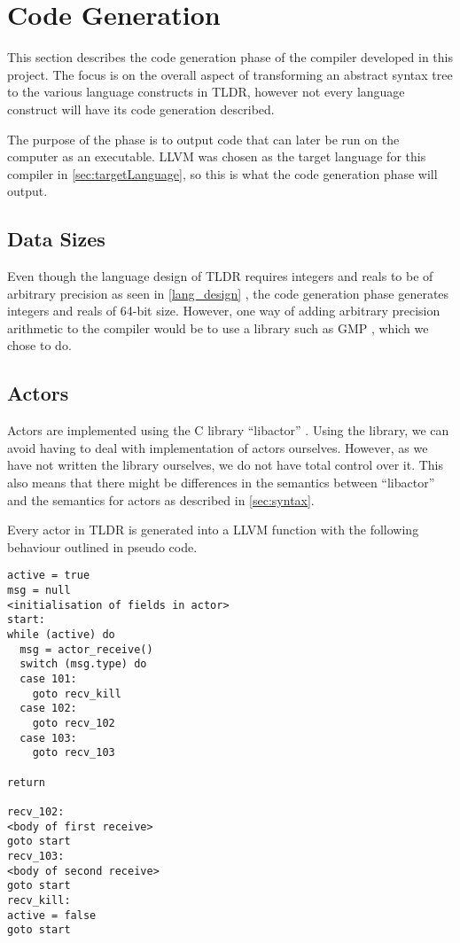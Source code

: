\section{Code Generation}

This section describes the code generation phase of the compiler developed in this project. The focus is on the overall aspect of transforming an abstract syntax tree to the various language constructs in TLDR, however not every language construct will have its code generation described. 

The purpose of the phase is to output code that can later be run on the computer as an executable. LLVM was chosen as the target language for this compiler in \cref{sec:targetLanguage}, so this is what the code generation phase will output. 

\subsection{Data Sizes}

Even though the language design of TLDR requires integers and reals to be of arbitrary precision as seen in \cref{lang_design} , the code generation phase generates integers and reals of 64-bit size. However, one way of adding arbitrary precision arithmetic to the compiler would be to use a library such as GMP \cite{gmp}, which we chose to do.

\subsection{Actors}

Actors are implemented using the C library \enquote{libactor} \cite{libactor}. Using the library, we can avoid having to deal with implementation of actors ourselves. However, as we have not written the library ourselves, we do not have total control over it. This also means that there might be differences in the semantics between \enquote{libactor} and the semantics for actors as described in \cref{sec:syntax}.

Every actor in TLDR is generated into a LLVM function with the following behaviour outlined in pseudo code.

\begin{lstlisting}[breaklines]
active = true
msg = null
<initialisation of fields in actor>
start:
while (active) do
  msg = actor_receive()
  switch (msg.type) do
  case 101:
    goto recv_kill
  case 102:
    goto recv_102
  case 103:
    goto recv_103

return

recv_102:
<body of first receive>
goto start 
recv_103:
<body of second receive>
goto start 
recv_kill:
active = false
goto start
\end{lstlisting}

